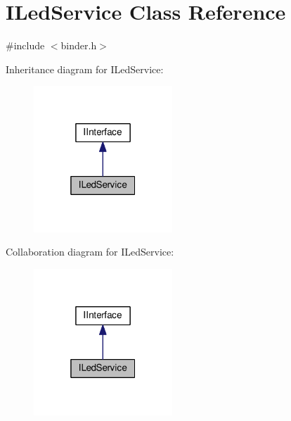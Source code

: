 \hypertarget{classILedService}{\section{I\-Led\-Service Class Reference}
\label{classILedService}
}


{\ttfamily \#include $<$binder.\-h$>$}



Inheritance diagram for I\-Led\-Service\-:
\nopagebreak
\begin{figure}[H]
\begin{center}
\leavevmode
\includegraphics[width=148pt]{classILedService__inherit__graph}
\end{center}
\end{figure}


Collaboration diagram for I\-Led\-Service\-:
\nopagebreak
\begin{figure}[H]
\begin{center}
\leavevmode
\includegraphics[width=148pt]{classILedService__coll__graph}
\end{center}
\end{figure}
